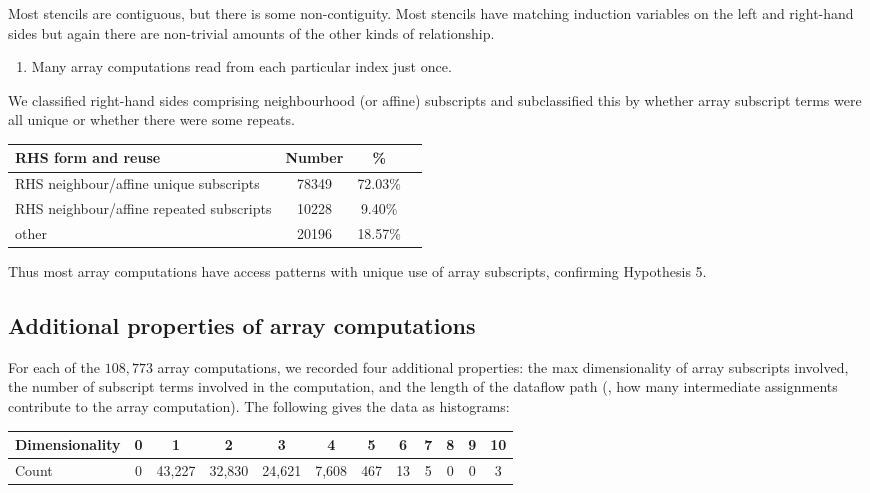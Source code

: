 Most stencils are contiguous, but there is some
non-contiguity. Most stencils have matching induction
variables on the left and right-hand sides but again there
are non-trivial amounts of the other kinds of relationship.
\begin{enumerate}[resume]
\item Many array computations read from each particular index just
  once.
\end{enumerate}
%
We classified right-hand sides comprising neighbourhood (or
affine) subscripts and subclassified this by whether array subscript terms were
all unique or whether there were some repeats.
%
\begin{center}
\begin{tabular}{l|S[table-format=4]S[table-format=2.2]S[table-format=4]}
\textbf{RHS form and reuse} & \textbf{Number} & \% \\ \hline
RHS neighbour/affine unique subscripts      & 78349     & 72.03\%  \\\hline
RHS neighbour/affine repeated subscripts   & 10228     & 9.40\%  \\\hline
other                             & 20196     & 18.57\%  %
\end{tabular}
\end{center}
%

Thus most array computations have access patterns with
unique use of array subscripts, confirming Hypothesis 5.

\subsection{Additional properties of array computations}
\label{subsec:additional-data}

\noindent
For each of the $108,773$ array computations, we recorded four
additional properties: the max dimensionality of array
subscripts involved, %
the number of subscript terms involved in the computation, and the
length of the dataflow path (\ie{}, how many intermediate assignments
contribute to the array computation). The following gives the data
as histograms:

\setlength{\tabcolsep}{0.25em}
\begin{center}
\begin{tabular}{l|ccccccccccc}
  \textbf{Dimensionality} & 0 & 1     & 2     & 3     & 4    & 5   & 6 & 7 & 8 & 9 & 10 \\\hline
  Count                   & 0 & 43,227 & 32,830 & 24,621 & 7,608 & 467 & 13 & 5 & 0 & 0 & 3
  \end{tabular}
\end{center}


